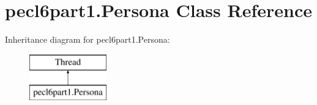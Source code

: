 \hypertarget{classpecl6part1_1_1_persona}{}\section{pecl6part1.\+Persona Class Reference}
\label{classpecl6part1_1_1_persona}
Inheritance diagram for pecl6part1.\+Persona\+:\begin{figure}[H]
\begin{center}
\leavevmode
\includegraphics[height=2.000000cm]{classpecl6part1_1_1_persona}
\end{center}
\end{figure}
